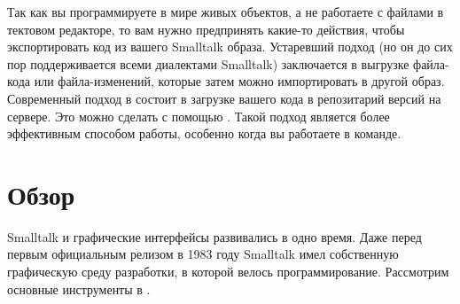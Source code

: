 \documentclass[a4paper,10pt,twoside]{book}
\begin{document}

Так как вы программируете в мире живых объектов, а не работаете с файлами в тектовом редакторе, то вам нужно предпринять какие-то действия, чтобы экспортировать код из вашего Smalltalk образа.
Устаревший подход (но он до сих пор поддерживается всеми диалектами Smalltalk) заключается в выгрузке файла-кода или файла-изменений, которые затем можно импортировать в другой образ.
Современный подход в \pharo состоит в загрузке вашего кода в репозитарий версий на сервере. Это можно сделать с помощью . Такой подход является более эффективным способом работы, особенно когда вы работаете в команде.


\section{Обзор}


Smalltalk и графические интерфейсы развивались в одно время.
Даже перед первым официальным релизом в 1983 году Smalltalk имел собственную графическую среду разработки, в которой велось программирование.
Рассмотрим основные инструменты в \pharo.
\end{document}
